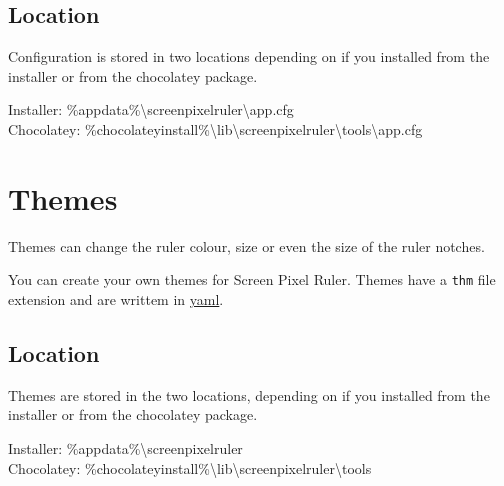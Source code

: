 \documentclass[
]{book}
\begin{document}
\hypertarget{location}{%
\section{Location}\label{location}}

Configuration is stored in two locations depending on if you installed from the installer or from the chocolatey package.

Installer: \%appdata\%\textbackslash screenpixelruler\textbackslash app.cfg\\
Chocolatey: \%chocolateyinstall\%\textbackslash lib\textbackslash screenpixelruler\textbackslash tools\textbackslash app.cfg

\hypertarget{themes}{%
\chapter{Themes}\label{themes}}

Themes can change the ruler colour, size or even the size of the ruler notches.

You can create your own themes for Screen Pixel Ruler.
Themes have a \texttt{thm} file extension and are writtem in \href{https://yaml.org}{yaml}.

\hypertarget{location-1}{%
\section{Location}\label{location-1}}

Themes are stored in the two locations, depending on if you installed from the installer or from the chocolatey package.

Installer: \%appdata\%\textbackslash screenpixelruler\\
Chocolatey: \%chocolateyinstall\%\textbackslash lib\textbackslash screenpixelruler\textbackslash tools
\end{document}
